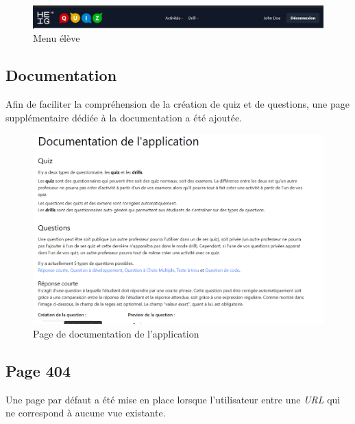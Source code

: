\begin{center}
    \begin{figure}[H]
        \includegraphics[width=\textwidth]{./assets/figures/studentNav.png}
        \caption{Menu élève}
    \end{figure}
\end{center}

\subsection{Documentation}
Afin de faciliter la compréhension de la création de quiz et de questions, une page supplémentaire dédiée à la documentation a été ajoutée.

\begin{center}
    \begin{figure}[H]
        \includegraphics[width=\textwidth]{./assets/figures/documentation.png}
        \caption{Page de documentation de l'application}
    \end{figure}
\end{center}

\subsection{Page 404}
Une page par défaut a été mise en place lorsque l'utilisateur entre une \emph{URL} qui ne correspond à aucune vue existante.

